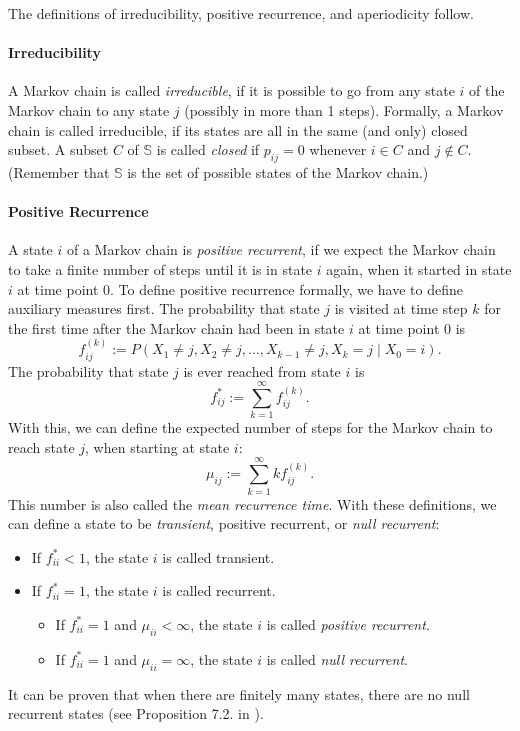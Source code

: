 The definitions of irreducibility, positive recurrence, and aperiodicity
follow.

\paragraph{Irreducibility}

A Markov chain is called \emph{irreducible}, if
it is possible to go from any state $i$ of the Markov chain to any
state $j$ (possibly in more than 1 steps). Formally, a Markov chain
is called irreducible, if its states are all in the same (and only)
closed subset. A subset $C$ of $\mathbb{S}$ is called \emph{closed
}if $p_{ij}=0$ whenever $i\in C$ and $j\notin C$. (Remember that
$\mathbb{S}$ is the set of possible states of the Markov chain.)

\paragraph{Positive Recurrence}

A state $i$ of a Markov chain is \emph{positive recurrent},
if we expect the Markov chain to take a finite number of steps until
it is in state $i$ again, when it started in state $i$ at time point
$0$. To define positive recurrence formally, we have to define auxiliary
measures first. The probability that state $j$ is visited at time
step $k$ for the first time after the Markov chain had been in state
$i$ at time point $0$ is 
\[
f_{ij}^{(k)}:=P(X_{1}\neq j,X_{2}\neq j,\dots,X_{k-1}\neq j,X_{k}=j\mid X_{0}=i).
\]
The probability that state $j$ is ever reached from state $i$ is
\[
f_{ij}^{*}:=\sum_{k=1}^{\infty}f_{ij}^{(k)}.
\]
With this, we can define the expected number of steps for the Markov
chain to reach state $j$, when starting at state $i$:
\[
\mu_{ij}:=\sum_{k=1}^{\infty}kf_{ij}^{(k)}.
\]
This number is also called the \emph{mean recurrence time}.
With these definitions, we can define a state to be \emph{transient},
positive recurrent, or \emph{null recurrent}:
\begin{itemize}
\item If $f_{ii}^{*}<1$, the state $i$ is called transient.
\item If $f_{ii}^{*}=1$, the state $i$ is called recurrent.

\begin{itemize}
\item If $f_{ii}^{*}=1$ and $\mu_{ii}<\infty$, the state $i$ is called
\emph{positive recurrent}.
\item If $f_{ii}^{*}=1$ and $\mu_{ii}=\infty$, the state $i$ is called
\emph{null recurrent}.
\end{itemize}
\end{itemize}
It can be proven that when there are finitely many states, there are
no null recurrent states (see Proposition 7.2. in \cite{Behrends2000}).


